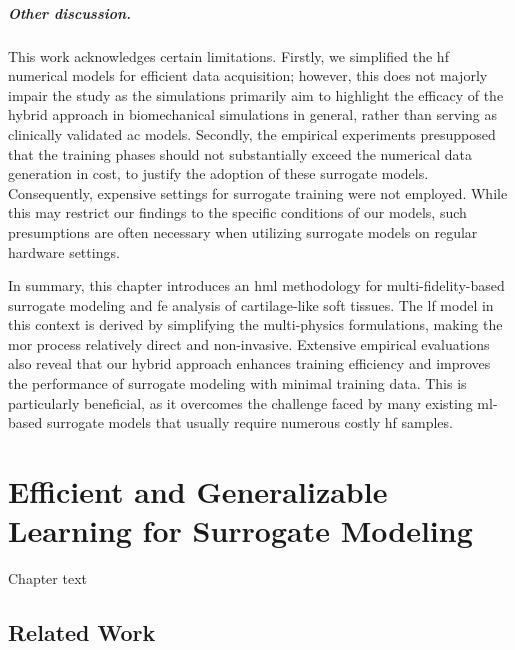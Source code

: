 \documentclass[12pt,a4paper]{report}
\begin{document}
\paragraph{Other discussion.} This work acknowledges certain limitations. Firstly, we simplified the \ac{hf} numerical models for efficient data acquisition; however, this does not majorly impair the study as the simulations primarily aim to highlight the efficacy of the hybrid approach in biomechanical simulations in general, rather than serving as clinically validated \ac{ac} models. Secondly, the empirical experiments presupposed that the training phases should not substantially exceed the numerical data generation in cost, to justify the adoption of these surrogate models. Consequently, expensive settings for surrogate training were not employed. While this may restrict our findings to the specific conditions of our models, such presumptions are often necessary when utilizing surrogate models on regular hardware settings.

In summary, this chapter introduces an \ac{hml} methodology for multi-fidelity-based surrogate modeling and \ac{fe} analysis of cartilage-like soft tissues. The \ac{lf} model in this context is derived by simplifying the multi-physics formulations, making the \ac{mor} process relatively direct and non-invasive. Extensive empirical evaluations also reveal that our hybrid approach enhances training efficiency and improves the performance of surrogate modeling with minimal training data. This is particularly beneficial, as it overcomes the challenge faced by many existing \ac{ml}-based surrogate models that usually require numerous costly \ac{hf} samples.









\chapter{Efficient and Generalizable Learning for Surrogate Modeling}
Chapter text

\section{Related Work}

\end{document}
